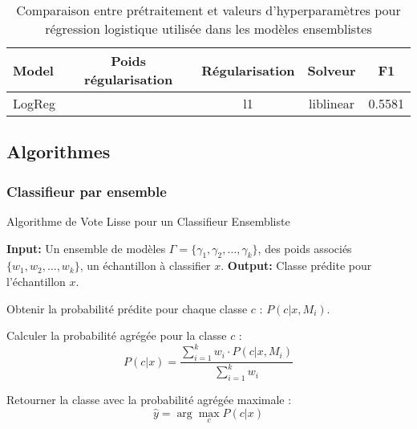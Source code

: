 \documentclass{article}
\begin{document}
\begin{table}[H]
    \centering
    \begin{tabular}{|l|c|c|c|c|}
        \hline
        \textbf{Model} & \textbf{Poids régularisation} &
        \textbf{Régularisation} &
        \textbf{Solveur} &
        \textbf{F1}\\
        \hline
        LogReg & & l1 & liblinear & 0.5581\\
        \hline
    \end{tabular}
    \caption{Comparaison entre prétraitement et valeurs d'hyperparamètres pour régression logistique utilisée dans les modèles ensemblistes}
    \label{tab:model_comparison}
\end{table}
\subsection{Algorithmes}
\subsubsection{Classifieur par ensemble}
\begin{algorithm}
\caption{Algorithme de Vote Lisse pour un Classifieur Ensembliste}
\begin{algorithmic}[1]
\STATE \textbf{Input:} Un ensemble de modèles  $\Gamma = \{\gamma_1, \gamma_2, \dots, \gamma_k\}$, des poids associés $\{w_1, w_2, \dots, w_k\}$, un échantillon à classifier $x$.
\STATE \textbf{Output:} Classe prédite pour l'échantillon $x$.

    \STATE Obtenir la probabilité prédite pour chaque classe $c$ : $P(c|x, M_i)$.
\ENDFOR

    \STATE Calculer la probabilité agrégée pour la classe $c$ :
    \[
    P(c|x) = \frac{\sum_{i=1}^k w_i \cdot P(c|x, M_i)}{\sum_{i=1}^k w_i}
    \]
\ENDFOR

\STATE Retourner la classe avec la probabilité agrégée maximale :
\[
\hat{y} = \arg\max_c P(c|x)
\]
\end{algorithmic}
\end{algorithm}
\end{document}
